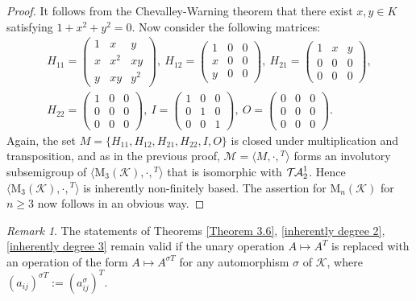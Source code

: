 \documentclass[11pt,reqno]{amsart}
\numberwithin{equation}{section}
\theoremstyle{remark}
\newtheorem{Rmk}{Remark}[section]
\def\si{\sigma}
\def\TA{\ensuremath{\mathcal{T\kern-1pt A}_2^1}}
\begin{document}
\begin{proof} It follows from the Chevalley-Warning theorem
\cite[Corollary~2 in \S1.2]{Serre} that there exist $x,y\in K$
satisfying $1+x^2+y^2=0$. Now consider the following matrices:
\begin{gather*}
H_{11}=\begin{pmatrix} 1 & x & y\\ x &x^2& xy\\ y & xy &
y^2\end{pmatrix},\ H_{12}=\begin{pmatrix} 1 & 0 & 0\\ x &0 &0\\ y
& 0 & 0\end{pmatrix},\
H_{21}=\begin{pmatrix} 1 & x & y\\ 0 & 0 & 0\\ 0 & 0&0\end{pmatrix},\\
H_{22}=\begin{pmatrix} 1 & 0 & 0\\ 0 & 0&0\\0&0&0\end{pmatrix},\
I=\begin{pmatrix} 1&0&0\\0&1&0\\0&0&1\end{pmatrix},\
O=\begin{pmatrix} 0&0&0\\0&0&0\\0&0&0\end{pmatrix}.
\end{gather*}
Again, the set $M=\{H_{11},H_{12},H_{21},H_{22},I,O\}$ is closed
under multiplication and transposition, and as in the previous
proof, $\mathcal{M}=\langle M ,\cdot,{}^T\rangle$ forms an
involutory subsemigroup of
$\langle\mathrm{M}_3(\mathcal{K}),\cdot,{}^T\rangle$ that is
isomorphic with $\TA$. Hence $\langle
\mathrm{M}_3(\mathcal{K}),\cdot,{}^T\rangle$ is inherently
non-finitely based. The assertion for $\mathrm{M}_n(\mathcal{K})$
for $n\ge 3$ now follows in an obvious way.
\end{proof}

\begin{Rmk}
The statements of Theorems \ref{Theorem 3.6}, \ref{inherently
degree 2}, \ref{inherently degree 3} remain valid if the unary
operation $A\mapsto A^T$ is replaced with an operation of the form
$A\mapsto A^{\si T}$ for any automorphism $\si$ of $\mathcal{K}$,
where $(a_{ij})^{\si T}:=(a_{ij}^\si)^T$.
\end{Rmk}
\end{document}
